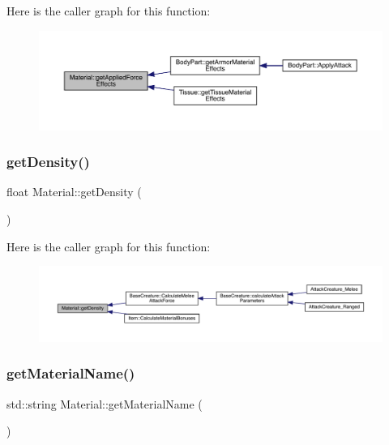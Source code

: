 Here is the caller graph for this function\+:
\nopagebreak
\begin{figure}[H]
\begin{center}
\leavevmode
\includegraphics[width=350pt]{dc/dee/class_material_ad443d451fe4f333fa2bd56f11937ebb0_icgraph}
\end{center}
\end{figure}
\mbox{\label{class_material_a40740dabb21cc8ba24b168935e10b06f}} 
\subsubsection{\texorpdfstring{get\+Density()}{getDensity()}}
{\footnotesize\ttfamily float Material\+::get\+Density (\begin{DoxyParamCaption}{ }\end{DoxyParamCaption})}

Here is the caller graph for this function\+:
\nopagebreak
\begin{figure}[H]
\begin{center}
\leavevmode
\includegraphics[width=350pt]{dc/dee/class_material_a40740dabb21cc8ba24b168935e10b06f_icgraph}
\end{center}
\end{figure}
\mbox{\label{class_material_a6259941981c91ac2f0c0baa0dd53c160}} 
\subsubsection{\texorpdfstring{get\+Material\+Name()}{getMaterialName()}}
{\footnotesize\ttfamily std\+::string Material\+::get\+Material\+Name (\begin{DoxyParamCaption}{ }\end{DoxyParamCaption})}

